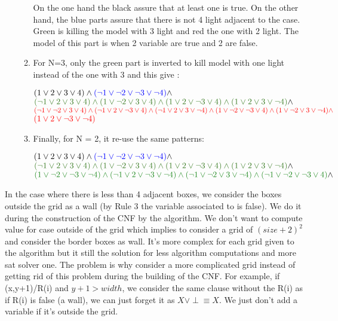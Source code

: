 \documentclass[a4paper]{article}
\begin{document}
\begin{enumerate}
\begin{enumerate}
On the one hand the black assure that at least one is true. On the other hand, the blue parts assure that there is not 4 light adjacent to the case. Green is killing the model with 3 light and red the one with 2 light. The model of this part is when 2 variable are true and 2 are false.
\item For N=3,  only the green part is inverted to kill model with one light instead of the one with 3 and this give :\newline
\begin{center}
$ ( 1 \lor 2 \lor 3 \lor 4) \land \textcolor{blue}{( \neg 1 \lor \neg 2 \lor \neg 3 \lor \neg 4)}  \land $ \newline
$\textcolor{OliveGreen}{( \neg 1 \lor 2 \lor 3 \lor 4 ) \land  ( 1 \lor \neg 2 \lor 3 \lor 4 ) \land ( 1 \lor 2 \lor \neg 3 \lor 4 ) \land ( 1 \lor 2 \lor 3 \lor \neg 4 )} \land $ \newline
$\textcolor{red}{( \neg 1 \lor \neg 2 \lor 3 \lor 4) \land ( \neg 1 \lor 2 \lor \neg 3 \lor 4 ) \land ( \neg 1 \lor 2 \lor 3 \lor \neg 4 ) \land ( 1 \lor \neg 2 \lor \neg 3 \lor 4 ) \land ( 1 \lor \neg 2 \lor 3 \lor \neg 4 ) \land} $ \newline $\textcolor{red}{ ( 1 \lor 2 \lor \neg 3 \lor \neg 4 )} $
\end{center}
\item Finally, for N = 2, it re-use the same patterns: \newline
\begin{center}
$ ( 1 \lor 2 \lor 3 \lor 4) \land \textcolor{blue}{( \neg 1 \lor \neg 2 \lor \neg 3 \lor \neg 4)}  \land $ \newline 
$\textcolor{OliveGreen}{( \neg 1 \lor 2 \lor 3 \lor 4 ) \land  ( 1 \lor \neg 2 \lor 3 \lor 4 ) \land ( 1 \lor 2 \lor \neg 3 \lor 4 ) \land ( 1 \lor 2 \lor 3 \lor \neg 4 )} \land $ \newline $\textcolor{ForestGreen}{( 1 \lor \neg 2 \lor \neg 3 \lor \neg 4 ) \land  ( \neg 1 \lor 2 \lor \neg 3 \lor \neg 4 ) \land ( \neg 1 \lor \neg 2 \lor 3 \lor \neg 4 ) \land ( \neg 1 \lor \neg 2 \lor \neg 3 \lor 4 )} \land $
\end{center}
\end{enumerate}
\end{enumerate}

In the case where there is less than 4 adjacent boxes, we consider the boxes outside the grid as a wall (by Rule 3 the variable associated to is false). We do it during the construction of the CNF by the algorithm. We don't want to compute value for case outside of the grid which implies to consider a grid of $(size+2)^2$ and consider the border boxes as wall. It's more complex for each grid given to the algorithm but it still the solution for less algorithm computations and more sat solver one. The problem is why consider a more complicated grid instead of getting rid of this problem during the building of the CNF. For example, if (x,y+1)/R(i) and $ y+1 > width $, we consider the same clause without the R(i) as if R(i) is false (a wall), we can just forget it as $ X \lor \perp \equiv X $. We just don't add a variable if it's outside the grid.
\end{document}
